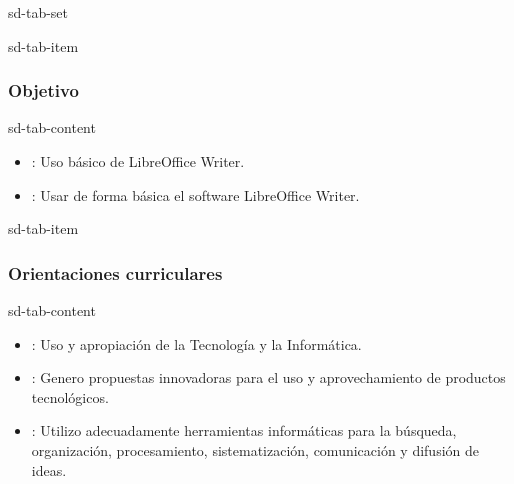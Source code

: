 \documentclass[letterpaper,10pt,spanish]{sphinxmanual}
\begin{document}
\begin{sphinxuseclass}{sd-tab-set}
\begin{sphinxuseclass}{sd-tab-item}\subsubsection*{Objetivo}

\begin{sphinxuseclass}{sd-tab-content}
\sphinxAtStartPar
{}
\begin{itemize}
\item {} 
\sphinxAtStartPar
{}: Uso básico de LibreOffice Writer.

\item {} 
\sphinxAtStartPar
{}: Usar de forma básica el software LibreOffice Writer.

\end{itemize}

\end{sphinxuseclass}
\end{sphinxuseclass}
\begin{sphinxuseclass}{sd-tab-item}\subsubsection*{Orientaciones curriculares}

\begin{sphinxuseclass}{sd-tab-content}\begin{itemize}
\item {} 
\sphinxAtStartPar
{}: Uso y apropiación de la Tecnología y la Informática.

\item {} 
\sphinxAtStartPar
{}: Genero propuestas innovadoras para el uso y aprovechamiento de productos tecnológicos.

\item {} 
\sphinxAtStartPar
{}: Utilizo adecuadamente herramientas informáticas para la búsqueda, organización, procesamiento, sistematización, comunicación y difusión de ideas.


\end{itemize}
\end{sphinxuseclass}
\end{sphinxuseclass}
\end{sphinxuseclass}
\end{document}
